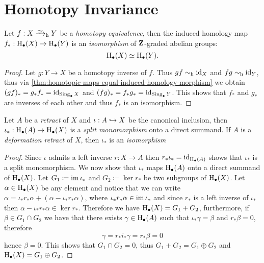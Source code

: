 \section{Homotopy Invariance}

\begin{corollary}
    \label{cor:htpy-equiv-iso-homology}
    Let \(f: X \isotoht Y\) be a \emph{homotopy equivalence}, then the induced
    homology map \(f_{*}: \operatorname{H}_{\bullet}(X) \to \operatorname{H}_{\bullet}(Y)\) is an
    \emph{isomorphism} of \(\mathbf{Z}\)-graded abelian groups:
    \[
        \operatorname{H}_{\bullet}(X) \simeq \operatorname{H}_{\bullet}(Y).
    \]
\end{corollary}

\begin{proof}
    Let \(g: Y \to X\) be a homotopy inverse of \(f\). Thus \(g f \sim_{\text{h}} \operatorname{id}_X\) and
    \(f g \sim_{\text{h}} \operatorname{id}_Y\), thus via
    \cref{thm:homotopic-maps-equal-induced-homology-morphism} we obtain \((g f)_{*}
    = g_{*} f_{*} = \operatorname{id}_{\operatorname{Sing}_{\bullet} X}\) and \((f g)_{*} = f_{*} g_{*} =
    \operatorname{id}_{\operatorname{Sing}_{\bullet} Y}\). This shows that \(f_{*}\) and \(g_{*}\) are inverses
    of each other and thus \(f_{*}\) is an isomorphism.
\end{proof}

\begin{corollary}
    \label{cor:retract-monic-homology}
    Let \(A\) be a \emph{retract} of \(X\) and \(\iota: A \hookrightarrow X\) be the canonical
    inclusion, then \(\iota_{*}: \operatorname{H}_{\bullet}(A) \to \operatorname{H}_{\bullet}(X)\) is a
    \emph{split monomorphism} onto a direct summand. If \(A\) is a \emph{deformation
        retract} of \(X\), then \(\iota_{*}\) is an \emph{isomorphism}
\end{corollary}

\begin{proof}
    Since \(\iota\) admits a left inverse \(r: X \to A\) then
    \(r_{*} \iota_{*} = \operatorname{id}_{\operatorname{H}_{\bullet}(A)}\) shows that \(\iota_{*}\) is a
    split monomorphism. We now show that \(\iota_{*}\) maps \(\operatorname{H}_{\bullet}(A)\)
    onto a direct summand of \(\operatorname{H}_{\bullet}(X)\). Let
    \(G_1 \coloneq \operatorname{im} \iota_{*}\) and \(G_2 \coloneq \ker r_{*}\) be two subgroups
    of \(\operatorname{H}_{\bullet}(X)\). Let \(\alpha \in \operatorname{H}_{\bullet}(X)\) be any element
    and notice that we can write
    \(\alpha = \iota_{*} r_{*} \alpha + (\alpha - \iota_{*} r_{*} \alpha)\), where
    \(\iota_{*} r_{*} \alpha \in \operatorname{im} \iota_{*}\) and since \(r_{*}\) is a left
    inverse of \(\iota_{*}\) then
    \(\alpha - \iota_{*} r_{*} \alpha \in \ker r_{*}\). Therefore we have
    \(\operatorname{H}_{\bullet}(X) = G_1 + G_2\), furthermore, if \(\beta \in G_1 \cap G_2\)
    we have that there exists \(\gamma \in \operatorname{H}_{\bullet}(A)\) such that
    \(\iota_{*} \gamma = \beta\) and \(r_{*} \beta = 0\), therefore
    \[
        \gamma = r_{*} i_{*} \gamma = r_{*} \beta = 0
    \]
    hence \(\beta = 0\). This shows that \(G_1 \cap G_2 = 0\), thus
    \(G_1 + G_2 = G_1 \oplus G_2\) and \(\operatorname{H}_{\bullet}(X) = G_1 \oplus G_2\).
\end{proof}

